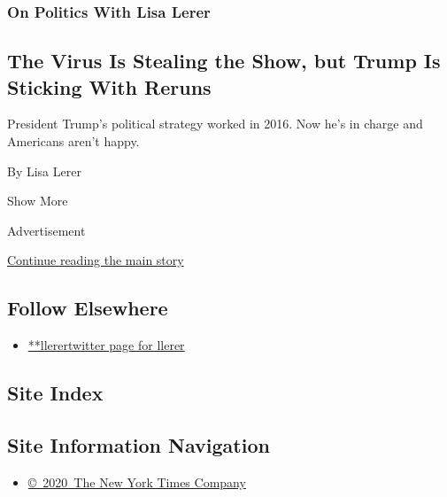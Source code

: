 \begin{enumerate}
  \hypertarget{on-politics-with-lisa-lerer-7}{%
  \subsubsection{On Politics With Lisa
  Lerer}\label{on-politics-with-lisa-lerer-7}}

  \hypertarget{the-virus-is-stealing-the-show-but-trump-is-sticking-with-reruns}{%
  \subsection{The Virus Is Stealing the Show, but Trump Is Sticking With
  Reruns}\label{the-virus-is-stealing-the-show-but-trump-is-sticking-with-reruns}}

  President Trump's political strategy worked in 2016. Now he's in
  charge and Americans aren't happy.

  By Lisa Lerer
\end{enumerate}

Show More

Advertisement

\protect\hyperlink{after-mid2}{Continue reading the main story}

\hypertarget{follow-elsewhere}{%
\subsection{Follow Elsewhere}\label{follow-elsewhere}}

\begin{itemize}
\tightlist
\item
  \href{https://twitter.com/llerer}{**llerertwitter page for llerer}
\end{itemize}

\hypertarget{site-index}{%
\subsection{Site Index}\label{site-index}}

\hypertarget{site-information-navigation}{%
\subsection{Site Information
Navigation}\label{site-information-navigation}}

\begin{itemize}
\tightlist
\item
  \href{https://help.nytimes.com/hc/en-us/articles/115014792127-Copyright-notice}{©~2020~The
  New York Times Company}
\end{itemize}

